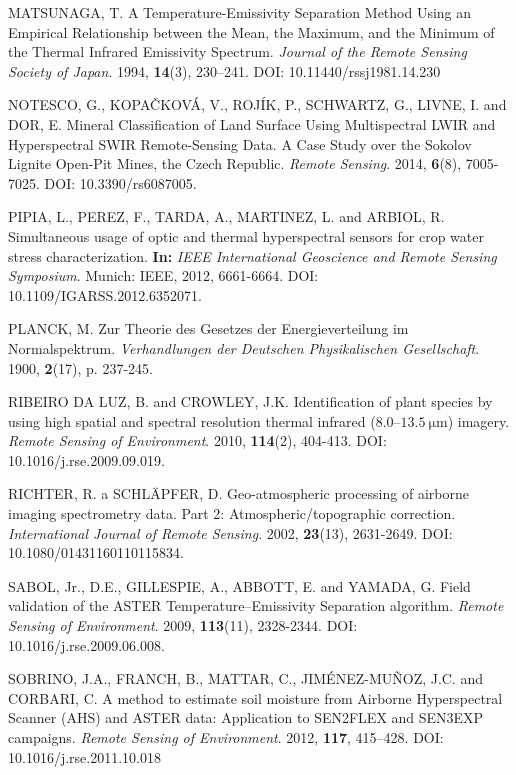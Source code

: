 \begin{thebibliography}{10}
 MATSUNAGA, T. A Temperature-Emissivity Separation Method Using an Empirical Relationship between the Mean, the Maximum, and the Minimum of the Thermal Infrared Emissivity Spectrum. \textit{Journal of the Remote Sensing Society of Japan}. 1994, \textbf{14}(3), 230–241. DOI: 10.11440/rssj1981.14.230

 NOTESCO, G., KOPAČKOVÁ, V., ROJÍK, P., SCHWARTZ, G., LIVNE, I. and DOR, E. Mineral Classification of Land Surface Using Multispectral LWIR and Hyperspectral SWIR Remote-Sensing Data. A Case Study over the Sokolov Lignite Open-Pit Mines, the Czech Republic. \textit{Remote Sensing}. 2014, \textbf{6}(8), 7005-7025. DOI: 10.3390/rs6087005.

 PIPIA, L., PEREZ, F., TARDA, A., MARTINEZ, L. and ARBIOL, R. Simultaneous usage of optic and thermal hyperspectral sensors for crop water stress characterization. \textbf{In:} \textit{IEEE International Geoscience and Remote Sensing Symposium}. Munich: IEEE, 2012, 6661-6664. DOI: 10.1109/IGARSS.2012.6352071. 

 PLANCK, M. Zur Theorie des Gesetzes der Energieverteilung im Normalspektrum. \textit{Verhandlungen der Deutschen Physikalischen Gesellschaft}. 1900, \textbf{2}(17), p. 237-245.

 RIBEIRO DA LUZ, B. and CROWLEY, J.K. Identification of plant species by using high spatial and spectral resolution thermal infrared (8.0–$\SI{13.5}{\micro\meter}$) imagery. \textit{Remote Sensing of Environment}. 2010, \textbf{114}(2), 404-413. DOI: 10.1016/j.rse.2009.09.019.

 RICHTER, R. a SCHLÄPFER, D. Geo-atmospheric processing of airborne imaging spectrometry data. Part 2: Atmospheric/topographic correction. \textit{International Journal of Remote Sensing}. 2002, \textbf{23}(13), 2631-2649. DOI: 10.1080/01431160110115834.

 SABOL, Jr., D.E., GILLESPIE, A., ABBOTT, E. and YAMADA, G. Field validation of the ASTER Temperature–Emissivity Separation algorithm. \textit{Remote Sensing of Environment}. 2009, \textbf{113}(11), 2328-2344. DOI: 10.1016/j.rse.2009.06.008.

 SOBRINO, J.A., FRANCH, B., MATTAR, C., JIMÉNEZ-MUÑOZ, J.C. and CORBARI, C. A method to estimate soil moisture from Airborne Hyperspectral Scanner (AHS) and ASTER data: Application to SEN2FLEX and SEN3EXP campaigns. \textit{Remote Sensing of Environment}. 2012, \textbf{117}, 415–428. DOI: 10.1016/j.rse.2011.10.018


\end{thebibliography}
